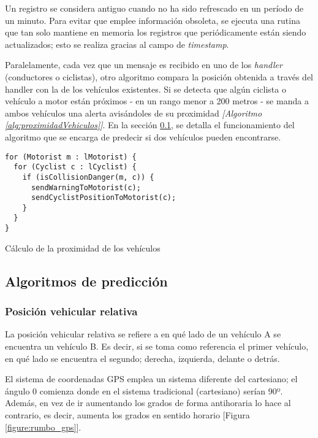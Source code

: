 Un registro se considera antiguo cuando no ha sido refrescado en un período de un minuto. Para evitar que emplee información obsoleta, se ejecuta una rutina que tan solo mantiene en memoria los registros que periódicamente están siendo actualizados; esto se realiza gracias al campo de \emph{timestamp}.

Paralelamente, cada vez que un mensaje es recibido en uno de los \emph{handler} (conductores o ciclistas), otro algoritmo compara la posición obtenida a través del handler con la de los vehículos existentes. Si se detecta que algún ciclista o vehículo a motor están próximos 
- en un rango menor a 200 metros - se manda a ambos vehículos una alerta avisándoles de su proximidad \emph{[Algoritmo \ref{alg:proximidadVehiculos}]}. En la sección \ref{ssection:algPrediccion}, se detalla el funcionamiento del algoritmo que se encarga de predecir si dos vehículos pueden encontrarse.

\begin{listing}
	\begin{minipage}{.4\textwidth}
		\begin{verbatim}
for (Motorist m : lMotorist) {
  for (Cyclist c : lCyclist) {
    if (isCollisionDanger(m, c)) {
      sendWarningToMotorist(c);
      sendCyclistPositionToMotorist(c);
    }
  }
}
		\end{verbatim}
	\end{minipage}
	\caption{Cálculo de la proximidad de los vehículos}\label{alg:proximidadVehiculos}
\end{listing}

\subsection{Algoritmos de predicción}\label{ssection:algPrediccion}
\subsubsection{Posición vehicular relativa}
La posición vehicular relativa se refiere a en qué lado de un vehículo A se encuentra un vehículo B. Es decir, si se toma como referencia el primer vehículo, en qué lado se encuentra el segundo; derecha, izquierda, delante o detrás.

El sistema de coordenadas GPS emplea un sistema diferente del cartesiano; el ángulo 0 comienza donde en el sistema tradicional (cartesiano) serían 90º. Además, en vez de ir aumentando los grados de forma antihoraria lo hace al contrario, es decir, aumenta los grados en sentido horario [Figura \ref{figure:rumbo_gps}].

